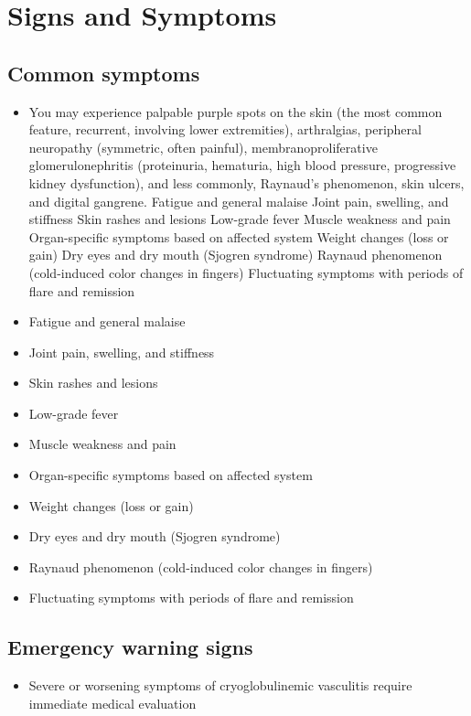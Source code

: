 \section{Signs and Symptoms}

\subsection{Common symptoms}
\begin{itemize}[noitemsep]
  \item You may experience palpable purple spots on the skin (the most common feature, recurrent, involving lower extremities), arthralgias, peripheral neuropathy (symmetric, often painful), membranoproliferative glomerulonephritis (proteinuria, hematuria, high blood pressure, progressive kidney dysfunction), and less commonly, Raynaud's phenomenon, skin ulcers, and digital gangrene. Fatigue and general malaise Joint pain, swelling, and stiffness Skin rashes and lesions Low-grade fever Muscle weakness and pain Organ-specific symptoms based on affected system Weight changes (loss or gain) Dry eyes and dry mouth (Sjogren syndrome) Raynaud phenomenon (cold-induced color changes in fingers) Fluctuating symptoms with periods of flare and remission
  \item Fatigue and general malaise
  \item Joint pain, swelling, and stiffness
  \item Skin rashes and lesions
  \item Low-grade fever
  \item Muscle weakness and pain
  \item Organ-specific symptoms based on affected system
  \item Weight changes (loss or gain)
  \item Dry eyes and dry mouth (Sjogren syndrome)
  \item Raynaud phenomenon (cold-induced color changes in fingers)
  \item Fluctuating symptoms with periods of flare and remission
\end{itemize}

\subsection{Emergency warning signs}
\begin{itemize}[noitemsep]
  \item Severe or worsening symptoms of cryoglobulinemic vasculitis require immediate medical evaluation
\end{itemize}
